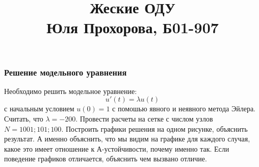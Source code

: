 \documentclass[11pt]{article}
\title{Жеские ОДУ \\
    Юля Прохорова, Б01-907}
\begin{document}
    
    \maketitle
    
    

    
    \hypertarget{ux440ux435ux448ux435ux43dux438ux435-ux43cux43eux434ux435ux43bux44cux43dux43eux433ux43e-ux443ux440ux430ux432ux43dux435ux43dux438ux44f}{%
\subsubsection{Решение модельного
уравнения}\label{ux440ux435ux448ux435ux43dux438ux435-ux43cux43eux434ux435ux43bux44cux43dux43eux433ux43e-ux443ux440ux430ux432ux43dux435ux43dux438ux44f}}

    Необходимо решить модельное уравнение: 
\begin{equation}
\label{eq:dalq}
u'(t) = \lambda u(t)
\end{equation}
 с начальным условием \(u(0) = 1\) с помошью явного и неявного метода
Эйлера. Считать, что \(\lambda = -200\). Провести расчеты на сетке с
числом узлов \(N = 1001; 101; 100\). Построить графики решения на одном
рисунке, объяснить результат. А именно объяснить, что мы видим на
графике для каждого случая, какое это имеет отношение к А-устойчивости,
почему именно так. Если поведение графиков отличается, объяснить чем
вызвано отличие.
\end{document}
